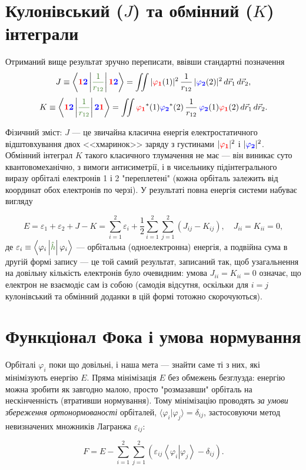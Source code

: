 \documentclass[]{article}
\def\bracket#1#2{\left\langle #1\left| #2 \right. \right\rangle }
\def\opbracket#1#2#3{\left\langle #1\left| \textcolor{OliveGreen}{#2}\right|  #3 \right\rangle}
\def\vr{\vec{r}}
\let\vphi\varphi
\let\ve\varepsilon
\def\F{\textcolor{red}{\mathbf{1}}}
\def\S{\textcolor{blue}{\mathbf{2}}}
\def\oa{\textcolor{red}{ \vphi_{\mathbf{1}}} }
\def\ob{\textcolor{blue}{ \vphi_{\mathbf{2}}} }
\def\h{\hat{h}}
\def\V{\frac{1}{r_{12}}}
\begin{document}
\section{Кулонівський ($J$) та обмінний ($K$) інтеграли}

Отриманий вище результат зручно переписати, ввівши стандартні позначення
\[
    J \equiv \opbracket{\F\S}{\V}{\F\S} = \iint |\oa(1)|^2\,\frac{1}{r_{12}}\,|\ob(2)|^2\, d\vr_1\, d\vr_2,
 \]
\[
    K \equiv \opbracket{\F\S}{\V}{\S\F} = \iint \oa^*(1)\ob^*(2)\,\frac{1}{r_{12}}\,\ob(1)\oa(2)\, d\vr_1\, d\vr_2 .
\]

Фізичний зміст: $J$ --- це звичайна класична енергія електростатичного відштовхування двох <<хмаринок>> заряду з густинами $|\oa|^2$ і $|\ob|^2$. Обмінний інтеграл $K$ такого класичного тлумачення не має --- він виникає суто квантовомеханічно, з вимоги антисиметрії, і в чисельнику підінтегрального виразу орбіталі електронів 1 і 2 "переплетені" (кожна орбіталь залежить від координат обох електронів по черзі). У результаті повна енергія системи набуває вигляду

\begin{equation*}
    E = \ve_1 + \ve_2 + J - K = \sum_{i = 1}^{2}\ve_i + \frac12 \sum_{i = 1}^{2} \sum_{j = 1}^{2} (J_{ij} - K_{ij}), \quad J_{ii} = K_{ii} = 0 ,
\end{equation*}
де $\ve_i\equiv\opbracket{\vphi_i}{\h}{\vphi_i}$ --- орбітальна (одноелектронна) енергія, а подвійна сума в другій формі запису --- це той самий результат, записаний так, щоб узагальнення на довільну кількість електронів було очевидним: умова $J_{ii}=K_{ii}=0$ означає, що електрон не взаємодіє сам із собою (самодія відсутня, оскільки для $i=j$ кулонівський та обмінний доданки в цій формі тотожно скорочуються).

\section{Функціонал Фока і умова нормування}

Орбіталі $\vphi_i$ поки що довільні, і наша мета --- знайти саме ті з них, які мінімізують енергію $E$. Пряма мінімізація $E$ без обмежень безглузда: енергію можна зробити як завгодно малою, просто "розмазавши" орбіталь на нескінченність (втративши нормування). Тому мінімізацію проводять \emph{за умови збереження ортонормованості} орбіталей, $\langle\vphi_i|\vphi_j\rangle=\delta_{ij}$, застосовуючи метод невизначених множників Лагранжа $\ve_{ij}$:

\begin{equation*}
    F = E - \sum_{i = 1}^{2} \sum_{j = 1}^{2} (\ve_{ij} \bracket{\vphi_i}{\vphi_j} - \delta_{ij}) .
\end{equation*}
\end{document}
